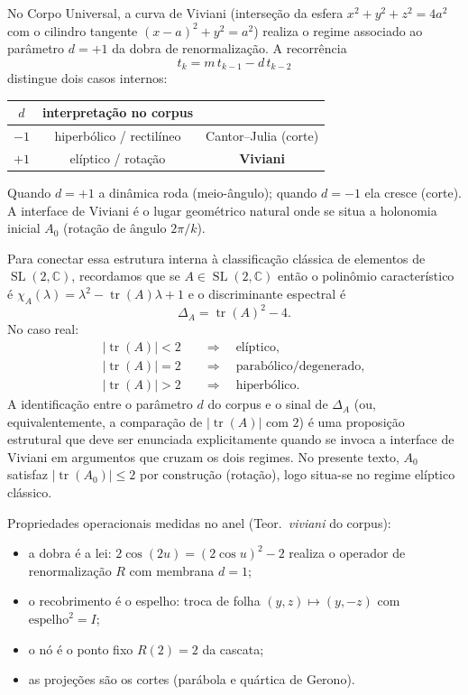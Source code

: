 \documentclass[11pt,a4paper]{article}
\begin{document}
No Corpo Universal, a curva de Viviani (interseção da esfera \(x^2+y^2+z^2=4a^2\) com o cilindro tangente \((x-a)^2+y^2=a^2\)) realiza o regime associado ao parâmetro \(d=+1\) da dobra de renormalização. A recorrência
\[
t_k = m\, t_{k-1} - d\, t_{k-2}
\]
distingue dois casos internos:
\begin{center}
\begin{tabular}{c|c|c}
\(d\) & interpretação no corpus & \\
\hline
\(-1\) & hiperbólico / rectilíneo & Cantor--Julia (corte) \\
\(+1\) & elíptico / rotação & \textbf{Viviani} \\
\end{tabular}
\end{center}
Quando \(d=+1\) a dinâmica roda (meio-ângulo); quando \(d=-1\) ela cresce (corte). A interface de Viviani é o lugar geométrico natural onde se situa a holonomia inicial \(A_0\) (rotação de ângulo \(2\pi/k\)).

Para conectar essa estrutura interna à classificação clássica de elementos de \(\operatorname{SL}(2,\mathbb{C})\), recordamos que se \(A\in\operatorname{SL}(2,\mathbb{C})\) então o polinômio característico é \(\chi_A(\lambda)=\lambda^2-\operatorname{tr}(A)\lambda+1\) e o discriminante espectral é
\[
\Delta_A=\operatorname{tr}(A)^2-4.
\]
No caso real:
\begin{align*}
\lvert\operatorname{tr}(A)\rvert<2 &\quad\Longrightarrow\quad\text{elíptico},\\
\lvert\operatorname{tr}(A)\rvert=2 &\quad\Longrightarrow\quad\text{parabólico/degenerado},\\
\lvert\operatorname{tr}(A)\rvert>2 &\quad\Longrightarrow\quad\text{hiperbólico}.
\end{align*}
A identificação entre o parâmetro \(d\) do corpus e o sinal de \(\Delta_A\) (ou, equivalentemente, a comparação de \(\lvert\operatorname{tr}(A)\rvert\) com \(2\)) é uma proposição estrutural que deve ser enunciada explicitamente quando se invoca a interface de Viviani em argumentos que cruzam os dois regimes. No presente texto, \(A_0\) satisfaz \(\lvert\operatorname{tr}(A_0)\rvert\le 2\) por construção (rotação), logo situa-se no regime elíptico clássico.

Propriedades operacionais medidas no anel (Teor.~\emph{viviani} do corpus):
\begin{itemize}
    \item a dobra é a lei: \(2\cos(2u)=(2\cos u)^2-2\) realiza o operador de renormalização \(R\) com membrana \(d=1\);
    \item o recobrimento é o espelho: troca de folha \((y,z)\mapsto(y,-z)\) com \(\mathrm{espelho}^2=I\);
    \item o nó é o ponto fixo \(R(2)=2\) da cascata;
    \item as projeções são os cortes (parábola e quártica de Gerono).
\end{itemize}
\end{document}
